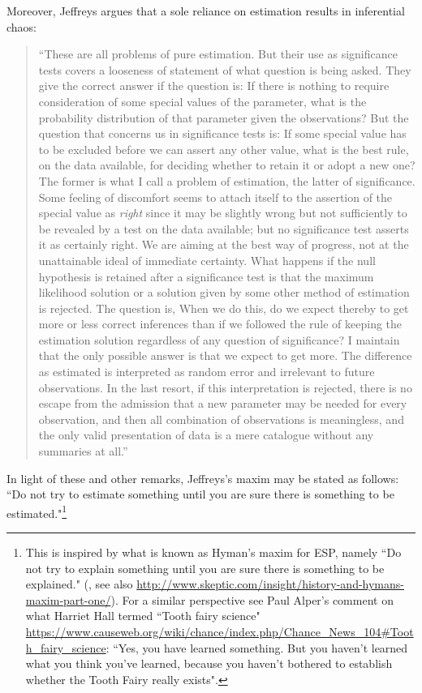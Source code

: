 Moreover, Jeffreys argues that a sole reliance on estimation results in inferential chaos:
\begin{quotation}
``These are all problems of pure estimation. But their use as significance tests covers a looseness of statement of what question is being asked. They give the correct answer if the question is: If there is nothing to require consideration of some special values of the parameter, what is the probability distribution of that parameter given the observations? But the question that concerns us in significance tests is: If some special value has to be excluded before we can assert any other value, what is the best rule, on the data available, for deciding whether to retain it or adopt a new one? The former is what I call a problem of estimation, the latter of significance. Some feeling of discomfort seems to attach itself to the assertion of the special value as \emph{right} since it may be slightly wrong but not sufficiently to be revealed by a test on the data available; but no significance test asserts it as certainly right. We are aiming at the best way of progress, not at the unattainable ideal of immediate certainty. What happens if the null hypothesis is retained after a significance test is that the maximum likelihood solution or a solution given by some other method of estimation is rejected. The question is, When we do this, do we expect thereby to get more or less correct inferences than if we followed the rule of keeping the estimation solution regardless of any question of significance? I maintain that the only possible answer is that we expect to get more. The difference as estimated is interpreted as random error and irrelevant to future observations. In the last resort, if this interpretation is rejected, there is no escape from the admission that a new parameter may be needed for every observation, and then all combination of observations is meaningless, and the only valid presentation of data is a mere catalogue without any summaries at all.'' \cite[pp. 387-388]{Jeffreys1961}
\end{quotation}

In light of these and other remarks, Jeffreys's maxim may be stated as follows: ``Do not try to estimate something until you are sure there is something to be estimated."\footnote{This is inspired by what is known as Hyman's maxim for ESP, namely ``Do not try to explain something until you are sure there is something to be explained." (, see also \url{http://www.skeptic.com/insight/history-and-hymans-maxim-part-one/}). For a similar perspective see Paul Alper's comment on what Harriet Hall termed ``Tooth fairy science" \url{https://www.causeweb.org/wiki/chance/index.php/Chance_News_104#Tooth_fairy_science}: ``Yes, you have learned something. But you haven't learned what you think you've learned, because you haven't bothered to establish whether the Tooth Fairy really exists".}

